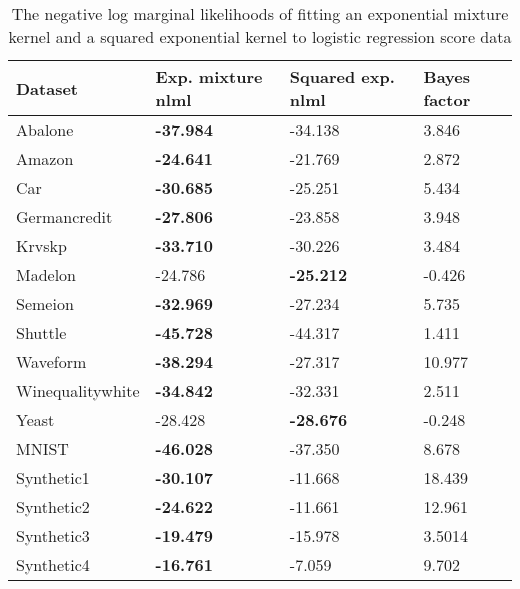 \documentclass[a4paper,12pt,twoside,openright]{report}
\begin{document}
\begin{table}
\centering
	\begin{tabular}{|l|l|l|l|}
\hline
Dataset          & Exp. mixture nlml & Squared exp. nlml & Bayes factor \\ \hline\hline
Abalone          & \textbf{-37.984}  & -34.138  & 3.846         \\ \hline
Amazon           & \textbf{-24.641}  & -21.769  & 2.872         \\ \hline
Car              & \textbf{-30.685}  & -25.251  & 5.434         \\ \hline
Germancredit     & \textbf{-27.806}  & -23.858  & 3.948         \\ \hline
Krvskp           & \textbf{-33.710}  & -30.226  & 3.484         \\ \hline
Madelon          & -24.786           & \textbf{-25.212} & -0.426  \\ \hline
Semeion          & \textbf{-32.969}  & -27.234  & 5.735         \\ \hline
Shuttle          & \textbf{-45.728}  & -44.317  & 1.411         \\ \hline
Waveform         & \textbf{-38.294}  & -27.317  & 10.977        \\ \hline
Winequalitywhite & \textbf{-34.842}  & -32.331  & 2.511         \\ \hline
Yeast            & -28.428           & \textbf{-28.676} & -0.248  \\ \hline\hline
MNIST            & \textbf{-46.028}  & -37.350  & 8.678         \\ \hline
Synthetic1       & \textbf{-30.107}  & -11.668  & 18.439        \\ \hline
Synthetic2       & \textbf{-24.622}  & -11.661  & 12.961        \\ \hline
Synthetic3       & \textbf{-19.479}  & -15.978  & 3.5014        \\ \hline
Synthetic4       & \textbf{-16.761}  & -7.059   & 9.702         \\ \hline
\end{tabular}

	\caption{The negative log marginal likelihoods of fitting an exponential mixture kernel and a squared exponential kernel to logistic regression score data}
\label{log_reg_fits}
\end{table}
\end{document}
